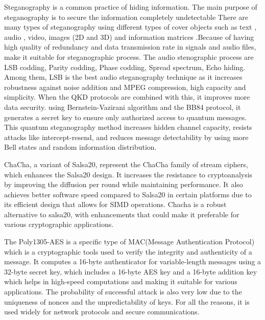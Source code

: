 \documentclass{article}
\begin{document}
Steganography is a common practice of hiding information. The main purpose of steganography is to secure the information completely undetectable\cite{amin2003information} There are many types of steganography using different types of cover objects such as text \cite{yang2018rnn}, audio \cite{jayaram2011information}\cite{hemeida2021comparative}\cite{djebbar2012comparative}, video, images (2D and 3D) \cite{farrag2020secure} and information matrices \cite{mashaly2019multiple}.Because of having high quality of redundancy and data transmission rate in signals and audio files, make it suitable for steganographic process.\cite{singh2014survey} The audio stenographic process are LSB codding, Parity codding, Phase codding, Spread spectrum, Echo hiding. Among them, LSB is the best audio steganography technique as it increases robustness against noise addition and MPEG compression, high capacity and simplicity.\cite{cvejic2004increasing}\cite{jayaram2011information}  When the QKD protocols are combined with this, it improves more data security. using  Bernstein-Vazirani algorithm and the BB84 protocol, it generates a secret key to ensure only authorized access to quantum messages. This quantum steganography method increases hidden channel capacity, resists attacks like intercept-resend, and reduces message detectability by using more Bell states and random information distribution.\cite{yalla2022novel}

ChaCha, a variant of Salsa20, represent the ChaCha family of stream ciphers, which enhances the Salsa20 design. It increases the resistance to cryptoanalysis by improving the diffusion per round while maintaining performance. It also achieves better software speed compared to Salsa20 in certain platforms due to its efficient design that allows for SIMD operations.\cite{bernstein2008chacha} Chacha is a robust alternative to salsa20, with enhancements that could make it preferable for various cryptographic applications.

The Poly1305-AES is a specific type of MAC(Message Authentication Protocol) which is a cryptographic tools used to verify the integrity and authenticity of a message.\cite{bernstein2005poly1305} It computes a 16-byte authenticator for variable-length messages using a 32-byte secret key, which includes a 16-byte AES key and a 16-byte addition key which helps in high-speed computations and making it suitable for various applications.\cite{bernstein2005poly1305} The probability of successful attack is also very low due to the uniqueness of nonces and the unpredictability of keys. For all the reasons, it is used widely for network protocols and secure communications.
\end{document}
